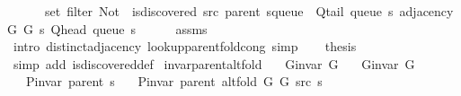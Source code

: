 \begin{isabellebody}
\ \ \ \ \ \ {\isacharparenleft}{\kern0pt}set\ {\isacharparenleft}{\kern0pt}filter\ {\isacharparenleft}{\kern0pt}Not\ {\isasymcirc}\ is{\isacharunderscore}{\kern0pt}discovered\ src\ {\isacharparenleft}{\kern0pt}parent\ {\isacharparenleft}{\kern0pt}s{\isasymlparr}queue\ {\isacharcolon}{\kern0pt}{\isacharequal}{\kern0pt}\ Q{\isacharunderscore}{\kern0pt}tail\ {\isacharparenleft}{\kern0pt}queue\ s{\isacharparenright}{\kern0pt}{\isasymrparr}{\isacharparenright}{\kern0pt}{\isacharparenright}{\kern0pt}{\isacharparenright}{\kern0pt}\ {\isacharparenleft}{\kern0pt}adjacency\ G{}\ G{}\ s\ {\isacharparenleft}{\kern0pt}Q{\isacharunderscore}{\kern0pt}head\ {\isacharparenleft}{\kern0pt}queue\ s{\isacharparenright}{\kern0pt}{\isacharparenright}{\kern0pt}{\isacharparenright}{\kern0pt}{\isacharparenright}{\kern0pt}{\isacharparenright}{\kern0pt}{\isachardoublequoteclose}\isanewline
\ \ \ \ \isamarkupfalse%
\ assms\isanewline
\ \ \ \ \isamarkupfalse%
\ {\isacharparenleft}{\kern0pt}intro\ distinct{\isacharunderscore}{\kern0pt}adjacency\ lookup{\isacharunderscore}{\kern0pt}parent{\isacharunderscore}{\kern0pt}fold{\isacharunderscore}{\kern0pt}cong{\isacharparenright}{\kern0pt}\ simp\isanewline
\ \ \isamarkupfalse%
\ {\isacharquery}{\kern0pt}thesis\isanewline
\ \ \ \ \isamarkupfalse%
\ {\isacharparenleft}{\kern0pt}simp\ add{\isacharcolon}{\kern0pt}\ is{\isacharunderscore}{\kern0pt}discovered{\isacharunderscore}{\kern0pt}def{\isacharparenright}{\kern0pt}\isanewline
{}\isamarkupfalse%
%
\endisatagproof
{\isafoldproof}%
%
\isadelimproof
%
\endisadelimproof
%
\isadelimdocument
%
\endisadelimdocument
%
\isatagdocument
%
\isamarkuptrue%
%
\endisatagdocument
{\isafolddocument}%
%
\isadelimdocument
%
\endisadelimdocument
{}\isamarkupfalse%
\ invar{\isacharunderscore}{\kern0pt}parent{\isacharunderscore}{\kern0pt}alt{\isacharunderscore}{\kern0pt}fold{\isacharcolon}{\kern0pt}\isanewline
\ \ \ {\isachardoublequoteopen}G{\isachardot}{\kern0pt}invar\ G{}{\isachardoublequoteclose}\isanewline
\ \ \ {\isachardoublequoteopen}G{\isachardot}{\kern0pt}invar\ G{}{\isachardoublequoteclose}\isanewline
\ \ \ {\isachardoublequoteopen}P{\isacharunderscore}{\kern0pt}invar\ {\isacharparenleft}{\kern0pt}parent\ s{\isacharparenright}{\kern0pt}{\isachardoublequoteclose}\isanewline
\ \ \ {\isachardoublequoteopen}P{\isacharunderscore}{\kern0pt}invar\ {\isacharparenleft}{\kern0pt}parent\ {\isacharparenleft}{\kern0pt}alt{\isacharunderscore}{\kern0pt}fold\ G{}\ G{}\ src\ s{\isacharparenright}{\kern0pt}{\isacharparenright}{\kern0pt}{\isachardoublequoteclose}\isanewline

\end{isabellebody}
